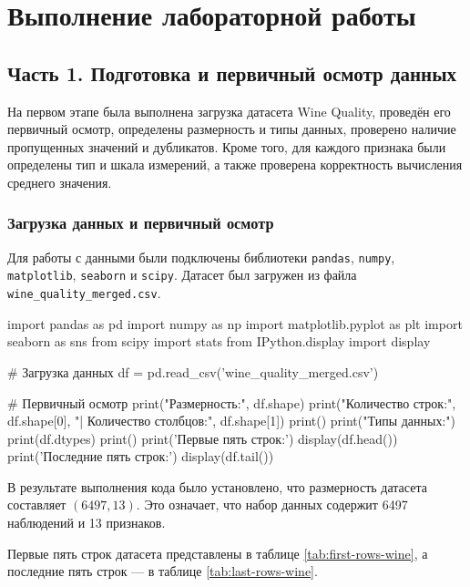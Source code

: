 \newpage

\section{Выполнение лабораторной работы} 

\subsection*{\textbf{Часть 1. Подготовка и первичный осмотр данных}}
 
На первом этапе была выполнена загрузка датасета Wine Quality, проведён его первичный осмотр, определены размерность и типы данных, проверено наличие пропущенных значений и дубликатов. Кроме того, для каждого признака были определены тип и шкала измерений, а также проверена корректность вычисления среднего значения.
 
\subsubsection*{Загрузка данных и первичный осмотр}
 
Для работы с данными были подключены библиотеки
\texttt{pandas}, \texttt{numpy}, \texttt{matplotlib},
\texttt{seaborn} и \texttt{scipy}. Датасет был загружен из файла \texttt{wine\_quality\_merged.csv}.
 
\begin{Code}
import pandas as pd
import numpy as np
import matplotlib.pyplot as plt
import seaborn as sns
from scipy import stats
from IPython.display import display

# Загрузка данных
df = pd.read_csv('wine_quality_merged.csv')

# Первичный осмотр
print("Размерность:", df.shape)
print("Количество строк:", df.shape[0], "| Количество столбцов:", df.shape[1])
print()
print("Типы данных:")
print(df.dtypes)
print()
print('Первые пять строк:')
display(df.head())
print('Последние пять строк:')
display(df.tail())
\end{Code}

В результате выполнения кода было установлено, что размерность датасета составляет $(6497, 13)$. Это означает, что набор данных содержит 6497 наблюдений и 13 признаков.
 
Первые пять строк датасета представлены в таблице
\ref{tab:first-rows-wine}, а последние пять строк --- в таблице
\ref{tab:last-rows-wine}.
 

